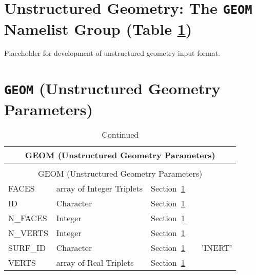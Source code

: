 \documentclass[12pt]{article}
\begin{document}
\vspace{1.0in}
\section{Unstructured Geometry: The \texorpdfstring{{\tt GEOM}}{GEOM} Namelist Group (Table \ref{tbl:GEOM})}
\label{info:GEOM}

Placeholder for development of unstructured geometry input format.

\vspace{\baselineskip}




\section{\texorpdfstring{{\tt GEOM}}{GEOM} (Unstructured Geometry Parameters)}


\setlength\LTleft{0pt}
\setlength\LTright{0pt}
\begin{longtable}{@{\extracolsep{\fill}}|l|l|l|l|l|}
\caption[Unstructured geometry parameters ({\ct GEOM} namelist group)]{For more information see Section~\ref{info:GEOM}.}
\label{tbl:GEOM} \\
\hline
\multicolumn{5}{|c|}{{\ct GEOM} (Unstructured Geometry Parameters)} \\
\hline \hline
\endfirsthead
\caption[]{Continued} \\
\hline
\multicolumn{5}{|c|}{{\ct GEOM} (Unstructured Geometry Parameters)} \\
\hline \hline
\endhead
{\ct FACES}        & array of Integer Triplets     & Section~\ref{info:GEOM}            &           &                          \\ \hline
{\ct ID}           & Character                     & Section~\ref{info:GEOM}            &           &                          \\ \hline
{\ct N\_FACES}     & Integer                       & Section~\ref{info:GEOM}            &           &                          \\ \hline
{\ct N\_VERTS}     & Integer                       & Section~\ref{info:GEOM}            &           &                          \\ \hline
{\ct SURF\_ID}     & Character                     & Section~\ref{info:GEOM}            &           &  {\ct 'INERT'}           \\ \hline
{\ct VERTS}        & array of Real Triplets        & Section~\ref{info:GEOM}            &           &                          \\ \hline
\end{longtable}


\vspace{\baselineskip}
\end{document}
